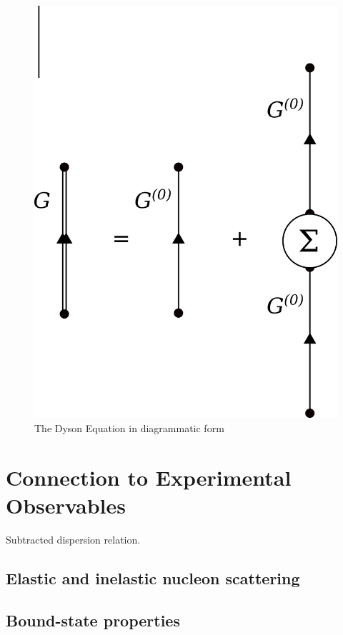 \begin{figure}
    \includegraphics[scale=0.35]{figures/DysonEquation.png}
    \caption{The Dyson Equation in diagrammatic form}
    \label{DysonEquation}
\end{figure}

\section{Connection to Experimental Observables}
Subtracted dispersion relation.

\subsection{Elastic and inelastic nucleon scattering}
\subsection{Bound-state properties}

